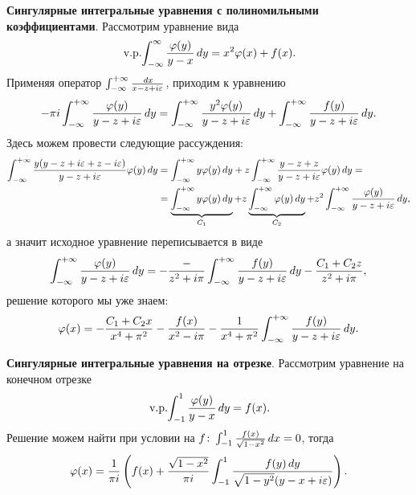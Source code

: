 \textbf{Сингулярные интегральные уравнения с полиномильными коэффициентами}. Рассмотрим уравнение вида
\begin{equation*}
	\,\textnormal{v.p.}\hspace{-2pt}\int_{-\infty}^{\infty} \frac{\varphi(y)}{y-x} \, d y 
	= x^2 \varphi(x) + f(x).
\end{equation*}
Применяя оператор $\int_{-\infty}^{+\infty} \frac{\, d x}{x - z + i \varepsilon}$, приходим к уравнению
\begin{equation*}
	-  \pi i \int_{-\infty}^{+\infty} \frac{\varphi(y)}{y-z +  i \varepsilon} \, d y = \int_{-\infty}^{+\infty} \frac{y^2 \varphi(y)}{y-z + i \varepsilon} \, d y +  \int_{-\infty}^{+\infty}  \frac{f(y)}{y-z + i \varepsilon} \, d y.
\end{equation*}
Здесь можем провести следующие рассуждения:
\begin{align*}
	\int_{-\infty}^{+\infty} \frac{y(y - z + i \varepsilon + z - i \varepsilon)}{y - z + i \varepsilon} \varphi(y) \, d y &= \int_{-\infty}^{+\infty} y \varphi(y) \, d y + z \int_{-\infty}^{+\infty} \frac{y - z + z}{y-z + i \varepsilon} \varphi(y) \, d y 
	= \\ &= 
	\underbrace{\int_{-\infty}^{+\infty} y \varphi(y) \, d y}_{C_1} + z \underbrace{\int_{-\infty}^{+\infty} \varphi(y) \, d y }_{C_2}+ z^2 \int_{-\infty}^{+\infty} \frac{\varphi(y)}{y-z + i \varepsilon} \, d y,
\end{align*}
а значит исходное уравнение переписывается в виде
\begin{equation*}
	\int_{-\infty}^{+\infty} \frac{\varphi(y)}{y-z + i \varepsilon} \, d y = - \frac{-}{z^2 + i \pi} \int_{-\infty}^{+\infty} \frac{f(y)}{y-z + i \varepsilon} \, d y - \frac{C_1 + C_2 z}{z^2 + i \pi},
\end{equation*}
решение которого мы уже знаем:
\begin{equation*}
	\varphi(x) = - \frac{C_1 + C_2 x}{x^4 + \pi^2} - \frac{f(x)}{x^2 - i \pi} - \frac{1}{x^4 + \pi^2} \int_{-\infty}^{+\infty} \frac{f(y)}{y-z + i \varepsilon} \, d y.
\end{equation*}

\textbf{Сингулярные интегральные уравнения на отрезке}. Рассмотрим  уравнение на конечном отрезке
\begin{equation*}
	\,\textnormal{v.p.}\hspace{-2pt}\int_{-1}^{1} \frac{\varphi(y)}{y-x} \, d y = f(x).
\end{equation*}
Решение можем найти при условии на $f\colon \int_{-1}^{1} \frac{f(x)}{\sqrt{1-x^2}} \, d x = 0$, тогда
\begin{equation*}
	\varphi(x) = \frac{1}{\pi i}\left(
		f(x) + \frac{\sqrt{1-x^2}}{\pi i} \int_{-1}^{1} \frac{f(y) \, d y}{\sqrt{1-y^2} (y-x+i \varepsilon)}
	\right).
\end{equation*}



